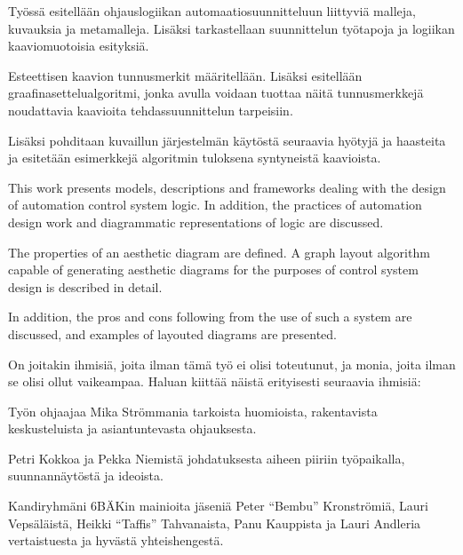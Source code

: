 \documentclass[finnish,12pt]{article}
\author{Ian Tuomi}
\date{6.12.2012}
\begin{document}
	 \makecoverpage

	\begin{abstractpage}[finnish]

Työssä esitellään ohjauslogiikan automaatiosuunnitteluun liittyviä malleja, kuvauksia ja metamalleja.
Lisäksi tarkastellaan suunnittelun työtapoja ja logiikan kaaviomuotoisia esityksiä.

Esteettisen kaavion tunnusmerkit määritellään.
Lisäksi esitellään graafinasettelualgoritmi, jonka avulla voidaan tuottaa näitä tunnusmerkkejä noudattavia kaavioita tehdassuunnittelun tarpeisiin.

Lisäksi pohditaan kuvaillun järjestelmän käytöstä seuraavia hyötyjä ja haasteita ja esitetään esimerkkejä algoritmin tuloksena syntyneistä kaavioista.

	\end{abstractpage}
	
	
	\begin{abstractpage}[english]
	
This work presents models, descriptions and frameworks dealing with the design of automation control system logic.
In addition, the practices of automation design work and diagrammatic representations of logic are discussed.

The properties of an aesthetic diagram are defined.
A graph layout algorithm capable of generating aesthetic diagrams for the purposes of control system design is described in detail.

In addition, the pros and cons following from the use of such a system are discussed, and examples of layouted diagrams are presented.

	\end{abstractpage}
	
	\newpage


On joitakin ihmisiä, joita ilman tämä työ ei olisi toteutunut, ja monia, joita ilman se olisi ollut vaikeampaa.
Haluan kiittää näistä erityisesti seuraavia ihmisiä:

Työn ohjaajaa Mika Strömmania tarkoista huomioista, rakentavista keskusteluista ja asiantuntevasta ohjauksesta.

Petri Kokkoa ja Pekka Niemistä johdatuksesta aiheen piiriin työpaikalla, suunnannäytöstä ja ideoista.

Kandiryhmäni 6BÄKin mainioita jäseniä
Peter “Bembu”  Kronströmiä,
Lauri Vepsäläistä,
Heikki “Taffis”  Tahvanaista,
Panu Kauppista
ja Lauri Andleria
vertaistuesta ja hyvästä yhteishengestä.
\end{document}
